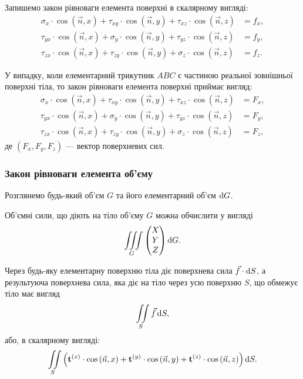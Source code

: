 Запишемо закон рівноваги елемента поверхні в скалярному вигляді:
\begin{align}
	\sigma_x \cdot \cos \left( \vec n, x \right) + \tau_{xy} \cdot \cos \left( \vec n, y \right) + \tau_{xz} \cdot \cos \left( \vec n, z \right) &= f_x, \\
	\tau_{yx} \cdot \cos \left( \vec n, x \right) + \sigma_y \cdot \cos \left( \vec n, y \right) + \tau_{yz} \cdot \cos \left( \vec n, z \right) &= f_y, \\
	\tau_{zx} \cdot \cos \left( \vec n, x \right) + \tau_{zy} \cdot \cos \left( \vec n, y \right) + \sigma_z \cdot \cos \left( \vec n, z \right) &= f_z.
\end{align}

У випадку, коли елементарний трикутник $ABC$ є частиною реальної зовнішньої поверхні тіла, то закон рівноваги елемента поверхні приймає вигляд:
\begin{align}
	\sigma_x \cdot \cos \left( \vec n, x \right) + \tau_{xy} \cdot \cos \left( \vec n, y \right) + \tau_{xz} \cdot \cos \left( \vec n, z \right) &= F_x, \\
	\tau_{yx} \cdot \cos \left( \vec n, x \right) + \sigma_y \cdot \cos \left( \vec n, y \right) + \tau_{yz} \cdot \cos \left( \vec n, z \right) &= F_y, \\
	\tau_{zx} \cdot \cos \left( \vec n, x \right) + \tau_{zy} \cdot \cos \left( \vec n, y \right) + \sigma_z \cdot \cos \left( \vec n, z \right) &= F_z,
\end{align}
де $(F_x, F_y, F_z)$ --- вектор поверхневих сил. \medskip

\subsubsection{Закон рівноваги елемента об'єму}

Розглянемо будь-який об'єм $G$ та його елементарний об'єм $\mathop{}\!\mathrm{d} G$. \medskip

Об'ємні сили, що діють на тіло об'єму $G$ можна обчислити у вигляді
\begin{equation}
	\displaystyle\iiint\limits_G \begin{pmatrix} X \\ Y \\ Z \end{pmatrix} \mathop{}\!\mathrm{d} G.
\end{equation}

Через будь-яку елементарну поверхню тіла діє поверхнева сила $\vec f \cdot \mathop{}\!\mathrm{d} S$, а результуюча поверхнева сила, яка діє на тіло через усю поверхню $S$, що обмежує тіло має вигляд 
\begin{equation}
	\displaystyle\iint\limits_S \vec f \mathop{}\!\mathrm{d} S,
\end{equation}
або, в скалярному вигляді:
\begin{equation}
	\displaystyle\iint\limits_S \left( \textbf{t}^{(x)} \cdot \cos \left( \vec n, x \right) + \textbf{t}^{(y)} \cdot \cos\left(\vec n, y\right) + \textbf{t}^{(z)} \cdot \cos \left(\vec n, z\right) \right) \mathop{}\!\mathrm{d} S.
\end{equation}

